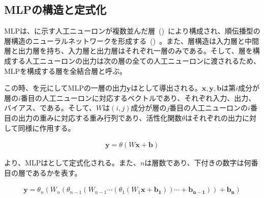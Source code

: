 \clearpage

\subsection{MLPの構造と定式化}

MLPは、に示す人工ニューロンが複数並んだ層~()~により構成され、順伝播型の層構造のニューラルネットワークを形成する~()~。また、層構造は入力層と中間層と出力層を持ち、入力層と出力層はそれぞれ一層のみである。そして、層を構成する人工ニューロンの出力は次の層の全ての人工ニューロンに渡されるため、MLPを構成する層を全結合層と呼ぶ。

この時、を元にしてMLPの一層の出力$\boldsymbol{y}$はとして導出される。$\boldsymbol{x},\boldsymbol{y},\boldsymbol{b}$は第$i$成分が層の$i$番目の人工ニューロンに対応するベクトルであり、それぞれ入力、出力、バイアス、である。そして、$W$は$(i,j)$成分が層の$j$番目の人工ニューロンの$i$番目の出力の重みに対応する重み行列であり、活性化関数$\theta$はそれぞれの出力に対して同様に作用する。

\begin{align}
    \label{eq:MLP0_1}
    \boldsymbol{y}=\theta(W\boldsymbol{x}+\boldsymbol{b})
\end{align}

より、MLPはとして定式化される。また、$n$は層数であり、下付きの数字は何番目の層であるかを表す。

\begin{align}
    \label{eq:MLP0_2}
    \boldsymbol{y}=\theta_{n}(W_{n}(\theta_{n-1}(W_{n-1}\cdots(\theta_{1}(W_{1}\boldsymbol{x}+\boldsymbol{b_{1}}))\cdots+\boldsymbol{b_{n-1}}))+\boldsymbol{b_{n}})
\end{align}


